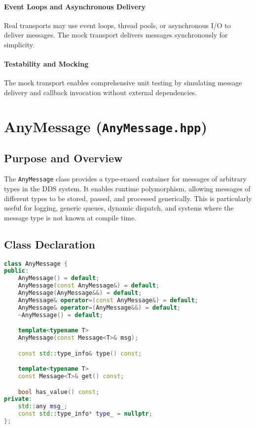 \documentclass[12pt]{report}
\begin{document}
\paragraph{Event Loops and Asynchronous Delivery}
Real transports may use event loops, thread pools, or asynchronous I/O to deliver messages. The mock transport delivers messages synchronously for simplicity.

\paragraph{Testability and Mocking}
The mock transport enables comprehensive unit testing by simulating message delivery and callback invocation without external dependencies.

\section{AnyMessage (\texttt{AnyMessage.hpp})}

\subsection{Purpose and Overview}
The \texttt{AnyMessage} class provides a type-erased container for messages of arbitrary types in the DDS system. It enables runtime polymorphism, allowing messages of different types to be stored, passed, and processed generically. This is particularly useful for logging, generic queues, dynamic dispatch, and systems where the message type is not known at compile time.

\subsection{Class Declaration}
\begin{lstlisting}[language=C++]
class AnyMessage {
public:
    AnyMessage() = default;
    AnyMessage(const AnyMessage&) = default;
    AnyMessage(AnyMessage&&) = default;
    AnyMessage& operator=(const AnyMessage&) = default;
    AnyMessage& operator=(AnyMessage&&) = default;
    ~AnyMessage() = default;

    template<typename T>
    AnyMessage(const Message<T>& msg);

    const std::type_info& type() const;

    template<typename T>
    const Message<T>& get() const;

    bool has_value() const;
private:
    std::any msg_;
    const std::type_info* type_ = nullptr;
};
\end{lstlisting}
\end{document}
